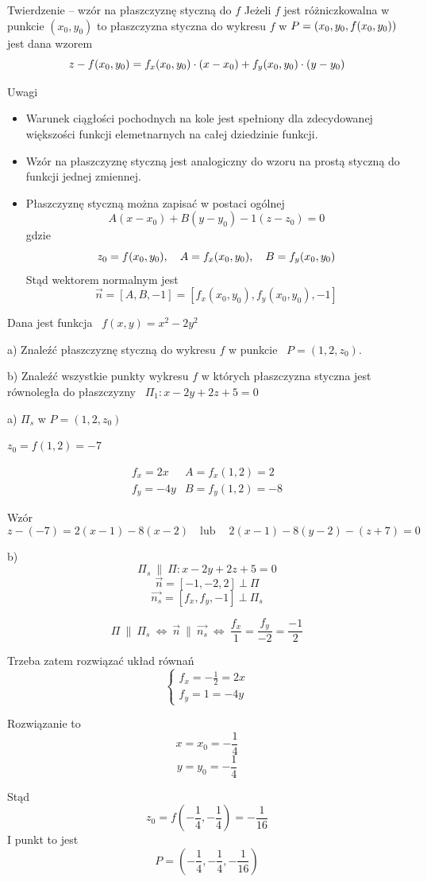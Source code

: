 \begin{tw}{Twierdzenie -- wzór na płaszczyznę styczną do $f$}
    Jeżeli $f$ jest różniczkowalna w punkcie $(x_0, y_0)$ to płaszczyzna styczna do wykresu $f$ w $P = (x_0, y_0, f(x_0, y_0))$ jest dana wzorem
    \[ z - f(x_0, y_0) = f_x(x_0, y_0) \cdot (x - x_0) + f_y(x_0, y_0) \cdot (y - y_0) \]
\end{tw}

Uwagi 
\begin{itemize}
    \item Warunek ciągłości pochodnych na kole jest spełniony dla zdecydowanej większości funkcji elemetnarnych na całej dziedzinie funkcji.
    \item Wzór na płaszczyznę styczną jest analogiczny do wzoru na prostą styczną do funkcji jednej zmiennej.
    \item Płaszczyznę styczną można zapisać w postaci ogólnej
    \[ A(x - x_0) + B(y - y_0) - 1(z - z_0) = 0 \]
    gdzie
    \[ z_0 = f(x_0, y_0), \quad A = f_x(x_0, y_0), \quad B = f_y(x_0, y_0) \]
    Stąd wektorem normalnym jest
    \[ \vec{n} = [A, B, -1] = [f_x(x_0, y_0), f_y(x_0, y_0), -1] \] 
\end{itemize}

\begin{przykladbig}
    Dana jest funkcja \ $ f(x,y) = x^2 - 2y^2 $

    a) Znaleźć płaszczyznę styczną do wykresu $f$ w punkcie \ $ P = (1, 2, z_0) $.

    b) Znaleźć wszystkie punkty wykresu $f$ w których płaszczyzna styczna jest równoległa do płaszczyzny \ $ \Pi_1: x - 2y + 2z + 5 = 0 $
    \bigskip

    a) $ \Pi_s $ w $ P = (1, 2, z_0)$

    $ z_0 = f(1,2) = -7 $

    \[ \begin{array}{cc}
        f_x = 2x & A = f_x(1,2) = 2 \\
        f_y = -4y & B = f_y(1,2) = -8
    \end{array} \]

    Wzór 
    \[ z - (-7) = 2(x-1) - 8(x-2) \quad \text{lub} \quad \ 2(x-1) - 8(y-2) - (z+7) = 0 \]

    b)
    \[ \Pi_s \ \| \ \Pi : x - 2y + 2z + 5 = 0 \]
    \[ \vec{n} = [-1,-2,2] \ \bot \ \Pi \]
    \[ \vec{n_s} = [f_x, f_y, -1] \ \bot \ \Pi_s \]

    \[ \Pi \ \| \ \Pi_s \ \Leftrightarrow \ \vec{n} \ \| \ \vec{n_s} \ \Leftrightarrow \ \frac{f_x}{1} = \frac{f_y}{-2} = \frac{-1}{2} \]

    Trzeba zatem rozwiązać układ równań
    \[ \begin{cases}
        f_x = -\frac{1}{2} = 2x \\
        f_y = 1 = -4y
    \end{cases} \]

    Rozwiązanie to
    \[ x = x_0 = -\frac{1}{4} \]
    \[ y = y_0 = -\frac{1}{4} \]

    Stąd
    \[ z_0 = f(-\frac{1}{4}, -\frac{1}{4}) = -\frac{1}{16} \]
    I punkt to jest
    \[ P = (-\frac{1}{4}, -\frac{1}{4}, -\frac{1}{16}) \]
\end{przykladbig}

